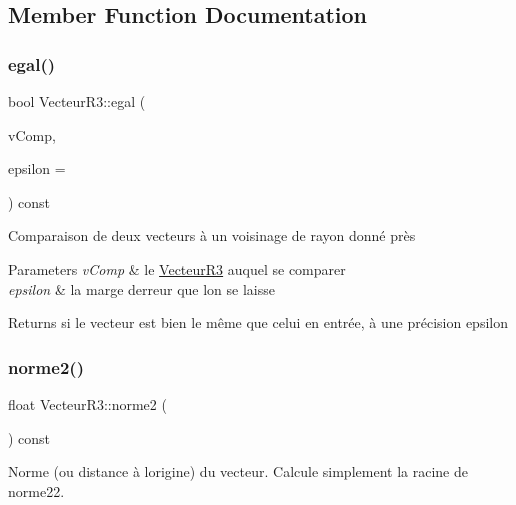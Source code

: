 \subsection{Member Function Documentation}
\mbox{\label{class_vecteur_r3_a3e37c4a2e567844b4c32bede3f1b357e}} 
\subsubsection{\texorpdfstring{egal()}{egal()}}
{\footnotesize\ttfamily bool Vecteur\+R3\+::egal (\begin{DoxyParamCaption}\item[{const \mbox{\hyperlink{class_vecteur_r3}{Vecteur\+R3}} \&}]{v\+Comp,  }\item[{const float \&}]{epsilon = {} }\end{DoxyParamCaption}) const}

Comparaison de deux vecteurs à un voisinage de rayon donné près 
\begin{DoxyParams}{Parameters}
{\em v\+Comp} & le \mbox{\hyperlink{class_vecteur_r3}{Vecteur\+R3}} auquel se comparer \\
\hline
{\em epsilon} & la marge d\textquotesingle{}erreur que l\textquotesingle{}on se laisse \\
\hline
\end{DoxyParams}
\begin{DoxyReturn}{Returns}
si le vecteur est bien le même que celui en entrée, à une précision epsilon 
\end{DoxyReturn}
\mbox{\label{class_vecteur_r3_a6c8bbc72999a06fd23e4213729f585b2}} 
\subsubsection{\texorpdfstring{norme2()}{norme2()}}
{\footnotesize\ttfamily float Vecteur\+R3\+::norme2 (\begin{DoxyParamCaption}{ }\end{DoxyParamCaption}) const}

Norme (ou distance à l\textquotesingle{}origine) du vecteur. Calcule simplement la racine de norme22. \mbox{\label{class_vecteur_r3_a014e36cfadce987c292edcf1db615cfd}} 

